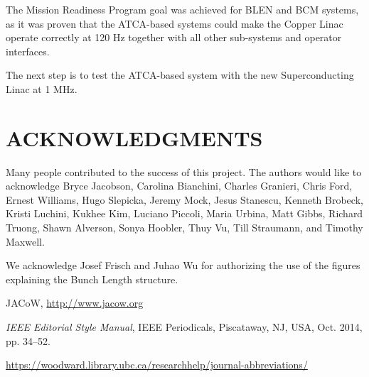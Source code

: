 \documentclass[letter,
        biblatex,   %
        keeplastbox,  %
        ]{jacow}
\begin{document}
The Mission Readiness Program goal was achieved for BLEN and BCM systems, as it was proven that the ATCA-based systems could make the Copper Linac operate correctly at 120 Hz together with all other sub-systems and operator interfaces.

The next step is to test the ATCA-based system with the new Superconducting Linac at 1 MHz.

\section{ACKNOWLEDGMENTS}
Many people contributed to the success of this project. The authors would like to acknowledge Bryce Jacobson, Carolina Bianchini, Charles Granieri, Chris Ford, Ernest Williams, Hugo Slepicka, Jeremy Mock, Jesus Stanescu, Kenneth Brobeck, Kristi Luchini, Kukhee Kim, Luciano Piccoli, Maria Urbina, Matt Gibbs, Richard Truong, Shawn Alverson, Sonya Hoobler, Thuy Vu, Till Straumann, and Timothy Maxwell.

We acknowledge Josef Frisch and Juhao Wu for authorizing the use of the figures explaining the Bunch Length structure.

%
%
%
	{\printbibliography}%
	{%
	
	\begin{thebibliography}{9} %
	
		JACoW,
		\url{http://www.jacow.org}
	
		\textit{IEEE Editorial Style Manual},
		IEEE Periodicals, Piscataway,
		NJ, USA, Oct. 2014, pp. 34--52.

	\url{https://woodward.library.ubc.ca/researchhelp/journal-abbreviations/}

	\end{thebibliography}
} %
\end{document}
